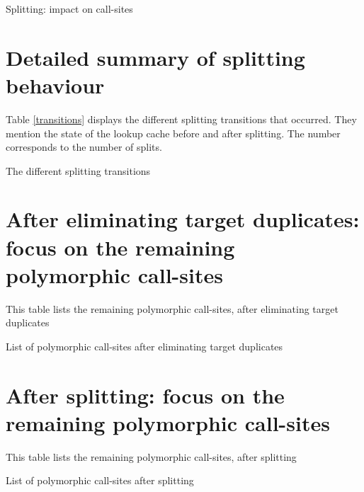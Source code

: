 \documentclass[preprint]{acmart}
\begin{document}
\begin{table}[h!]
	\centering
	\BeforeAfterSplitSites
	\caption{Splitting: impact on call-sites}
	\label{after_split_call_site}
\end{table}

\section{Detailed summary of splitting behaviour}

Table \ref{transitions} displays the different splitting transitions that occurred. They mention the state of the lookup cache before and after splitting. The number corresponds to the number of splits.

\begin{table}[h!]
	\centering
	\SplittingTransitions
	\caption{The different splitting transitions}
	\label{transitions}
\end{table}


\clearpage
\appendix
\section{After eliminating target duplicates: focus on the remaining polymorphic call-sites}
\label{aftertp}

This table lists the remaining polymorphic call-sites, after eliminating target duplicates

\begin{table}[h!]
	\centering
	\resizebox{\linewidth}{!}{
	\PolyAfterTP
	}
	\caption{List of polymorphic call-sites after eliminating target duplicates}
\end{table}


\section{After splitting: focus on the remaining polymorphic call-sites}
\label{aftersplitting}

This table lists the remaining polymorphic call-sites, after splitting

\begin{table}[h!]
	\centering
	\resizebox{\linewidth}{!}{
	\PolyAfterSplitting
	}
	\caption{List of polymorphic call-sites after splitting}
\end{table}
\end{document}
